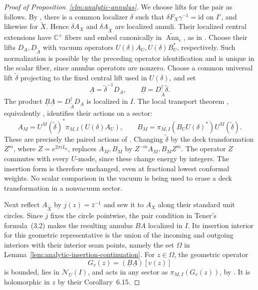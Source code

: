 \documentclass[11pt,a4paper]{article}
\theoremstyle{definition}
\begin{document}
\begin{proof}[Proof of Proposition~\ref{clm:analytic-annulus}]
We choose lifts for the pair as follows.  By
\cite[Lemma~3.19 and Corollary~3.20]{TenFields}, there is a common
localizer $\delta$ such that
$\delta F_X\gamma^{-1}=\mathrm{id}$ on $I'$, and likewise for
$\widetilde X$.  Hence $\delta A_X$ and $\delta A_{\widetilde X}$
are localized annuli.  Their localized central extensions have
$\mathbb C^\times$ fibers and embed canonically in
$\widetilde{\operatorname{Ann}}_c$, as in \cite[Section~7]{HTAnn}.
Choose their lifts $D_A,D_{\widetilde A}$ with vacuum operators
$U(\delta)A_U,U(\delta)B_U^*$, respectively.  Such normalization
is possible by the preceding operator identification and is unique
in the scalar fiber, since annulus operators are nonzero.
Choose a common universal lift $\widetilde\delta$ projecting to the
fixed central lift used in $U(\delta)$, and set
\[
 \underline A=\widetilde\delta^{-1}D_A,
 \qquad
 \underline B=D_{\widetilde A}^{\dagger}\widetilde\delta.
\]
The product $\underline B\underline A
=D_{\widetilde A}^{\dagger}D_A$ is localized in $I$.
The local transport theorem \cite[Theorem~7.4]{HTAnn}, equivalently
\cite[Proposition~4.17]{HTNet}, identifies their actions on a sector:
\[
 A_M=U^M(\widetilde\delta)^*\pi_{M,I}(U(\delta)A_U),
 \qquad
 B_M=\pi_{M,I}(B_UU(\delta)^*)U^M(\widetilde\delta).
\]
These are precisely the paired actions of
\cite[Section~5.1, formula~(5.2)]{TenFields}.
Changing $\widetilde\delta$ by the deck transformation
$Z^m$, where $Z=e^{2\pi iL_0}$, replaces $A_M,B_M$ by
$Z^{-m}A_M,B_MZ^m$.  The operator $Z$ commutes with every
$U$-mode, since these change energy by integers.  The insertion form
is therefore unchanged, even at fractional lowest conformal weights.
No scalar comparison in the vacuum is being used to erase a deck
transformation in a nonvacuum sector.

Next reflect $A_{\widetilde X}$ by $j(z)=\bar z^{-1}$ and sew it
to $A_X$ along their standard unit circles.  Since $j$ fixes the
circle pointwise, the pair condition in Tener's formula~(3.2) makes
the resulting annulus $BA$ localized in $I$.  Its insertion interior
for this geometric representative is the union of the incoming and
outgoing interiors with their
interior seam points, namely the set $\Omega$ in
Lemma~\ref{lem:analytic-insertion-continuation}.
For $z\in\Omega$, the geometric operator
\[
 G_v(z)=(\underline B\underline A)[v(z)]
\]
is bounded, lies in $\mathcal N_U(I)$, and acts in any sector as
$\pi_{M,I}(G_v(z))$, by \cite[Lemma~6.8]{HTNet}.
It is holomorphic in $z$ by their Corollary~6.15.


\end{proof}
\end{document}

